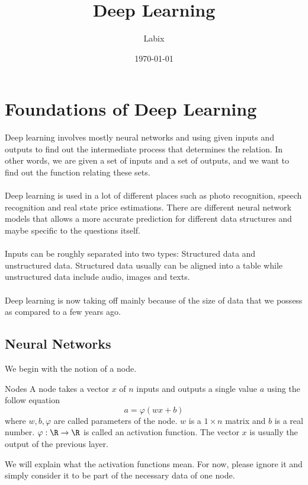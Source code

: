 \documentclass[a4paper]{article}
\title{Deep Learning}
\author{Labix}
\date{\today}
\begin{document}
\maketitle
\begin{abstract}
\end{abstract}
\tableofcontents
\pagebreak

\section{Foundations of Deep Learning}
Deep learning involves mostly neural networks and using given inputs and outputs to find out the intermediate process that determines the relation. In other words, we are given a set of inputs and a set of outputs, and we want to find out the function relating these sets. \\~\\
Deep learning is used in a lot of different places such as photo recognition, speech recognition and real state price estimations. There are different neural network models that allows a more accurate prediction for different data structures and maybe specific to the questions itself. \\~\\
Inputs can be roughly separated into two types: Structured data and unstructured data. Structured data usually can be aligned into a table while unstructured data include audio, images and texts. \\~\\
Deep learning is now taking off mainly because of the size of data that we possess as compared to a few years ago. 

\subsection{Neural Networks}
We begin with the notion of a node. 

\begin{defn}{Nodes}{} A node takes a vector $x$ of $n$ inputs and outputs a single value $a$ using the follow equation $$a=\varphi(wx+b)$$ where $w,b,\varphi$ are called parameters of the node. $w$ is a $1\times n$ matrix and $b$ is a real number. $\varphi:\R\to\R$ is called an activation function. The vector $x$ is usually the output of the previous layer. 
\end{defn}

We will explain what the activation functions mean. For now, please ignore it and simply consider it to be part of the necessary data of one node. 
\end{document}
